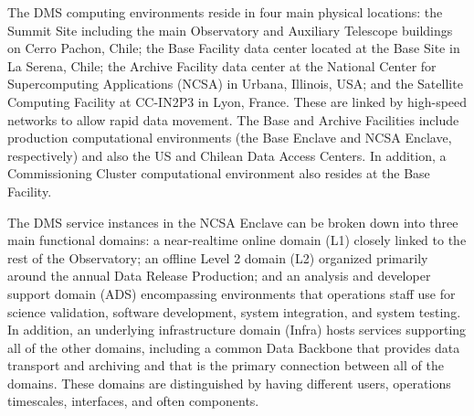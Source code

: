 \documentclass[DM,lsstdraft,toc]{lsstdoc}
\begin{document}
The DMS computing environments reside in four main physical locations:
the Summit Site including the main Observatory and Auxiliary Telescope
buildings on Cerro Pachon, Chile; the Base Facility data center located
at the Base Site in La Serena, Chile; the Archive Facility data center
at the National Center for Supercomputing Applications (NCSA) in Urbana,
Illinois, USA; and the Satellite Computing Facility at CC-IN2P3 in Lyon,
France. These are linked by high-speed networks to allow rapid data
movement. The Base and Archive Facilities include production
computational environments (the Base Enclave and NCSA Enclave,
respectively) and also the US and Chilean Data Access Centers. In
addition, a Commissioning Cluster computational environment also resides
at the Base Facility.

The DMS service instances in the NCSA Enclave can be broken down into
three main functional domains: a near-realtime online domain (L1)
closely linked to the rest of the Observatory; an offline Level 2 domain
(L2) organized primarily around the annual Data Release Production; and
an analysis and developer support domain (ADS) encompassing environments
that operations staff use for science validation, software development,
system integration, and system testing. In addition, an underlying
infrastructure domain (Infra) hosts services supporting all of the other
domains, including a common Data Backbone that provides data transport
and archiving and that is the primary connection between all of the
domains. These domains are distinguished by having different users,
operations timescales, interfaces, and often components.
\end{document}
